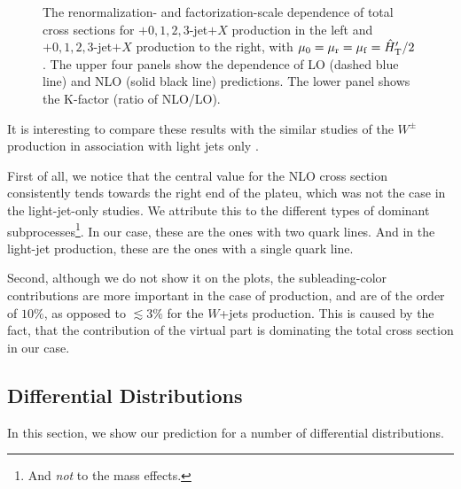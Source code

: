 \begin{figure}[t]
\begin{center}
\end{center}
\caption{The renormalization- and factorization-scale dependence of total cross
  sections for \Wbbm$+0,1,2,3$-jet$+X$ production in the left and
\Wbbp$+0,1,2,3$-jet$+X$ production to the right,
 with $\mu_0=\mu_\mathrm{r}=\mu_\mathrm{f}={\hat H}_{\mathrm T}'/2$. 
The upper four panels show the dependence of LO (dashed blue line) and
  NLO (solid black line) predictions. The lower panel shows
  the K-factor (ratio of NLO/LO).}
\label{fig_Wjets_sdep}
\end{figure}

It is interesting to compare these results with the similar studies of the $W^{\pm}$ production in association with light jets only \cite{BH:W3jPRL,BH:W4j,BH:W5j,Mangano:2016jyj,Anger:2017nkq}.

First of all, we notice that the central value for the NLO cross section consistently tends towards the right end of the plateu,
which was not the case in the light-jet-only studies. We attribute this
to the different types of dominant subprocesses\footnote{And \emph{not} to the mass effects.}.
In our case, these are the ones with two quark lines.
And in the light-jet production, these are the ones with a single quark line.

Second, although we do not show it on the plots,
the subleading-color contributions are more important in the case of \Wbbn{} production,
and are of the order of $10\%$, as opposed to  $\lesssim 3\%$ for the $W$+jets production.
This is caused by the fact, that the contribution of the virtual part
is dominating the total cross section in our case.

\subsection{Differential Distributions}
\label{diffxsw}

In this section, we show our prediction for a number of differential distributions.

